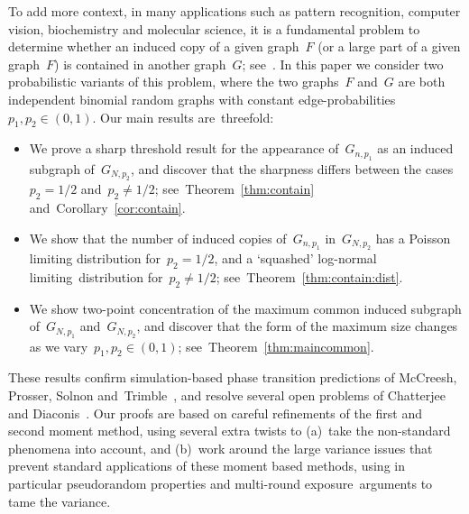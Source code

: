 \documentclass{article}
\begin{document}
To add more context, in many applications such as pattern recognition, computer vision, biochemistry and molecular science, 
it is a fundamental problem to determine whether an induced copy of a given graph~$F$ (or a large part of a given graph~$F$) is contained in another graph~$G$; see~\cite{Cook1994,Raymond2002,Conte2004,Damiand2011,ehrlich2011maximum,Giugno2013,Bonnici2013,mccreesh2018subgraph}. 
In this paper we consider two probabilistic variants of this problem, 
where the two graphs~$F$ and~$G$ are both independent binomial random graphs with constant edge-probabilities~$p_1,p_2 \in (0,1)$. 
Our main results are~threefold:
\vspace{-0.25em}\begin{itemize}
\itemsep 0.125em \parskip 0em  \partopsep=0pt \parsep 0em 
	\item We prove a sharp threshold result for the appearance of~$G_{n,p_1}$ as an induced subgraph of~$G_{N,p_2}$, 
	and discover that the sharpness differs between the cases~$p_2=1/2$ and~$p_2 \neq 1/2$; see~Theorem~\ref{thm:contain} and~Corollary~\ref{cor:contain}.
\item We show that the number of induced copies of~$G_{n,p_1}$ in~$G_{N,p_2}$ has a Poisson limiting distribution for~$p_2=1/2$, and a `squashed' log-normal limiting~distribution for~$p_2 \neq 1/2$; see~Theorem~\ref{thm:contain:dist}.
	\item We show two-point concentration of the maximum common induced subgraph of~$G_{N, p_1}$ and~$G_{N,p_2}$, 
	and discover that the form of the maximum size changes as we vary~$p_1,p_2 \in (0,1)$; see~Theorem~\ref{thm:maincommon}.
\vspace{-0.25em}\end{itemize}
These results confirm simulation-based phase transition predictions of McCreesh, Prosser, Solnon and~Trimble~\cite{mccreesh2016subgraph,mccreesh2018subgraph}, 
and resolve several open problems of Chatterjee and Diaconis~\cite{chatterjee2021isomorphisms}. 
Our proofs are based on careful refinements of the first and second moment method, 
using several extra twists to 
(a)~take the non-standard phenomena into account, and 
(b)~work around the large variance issues that prevent standard applications of these moment based methods, 
using in particular pseudorandom properties and multi-round exposure~arguments to tame the variance.




\pagebreak[3]
\end{document}
